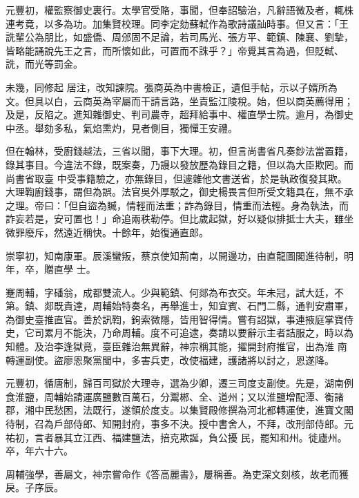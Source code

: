 \begin{pinyinscope}
 元豐初，權監察御史裏行。太學官受賂，事聞，但奉詔驗治，凡辭語微及者，輒株連考竟，以多為功。加集賢校理。同李定劾蘇軾作為歌詩議訕時事。但又言：「王詵輩公為朋比，如盛僑、周邠固不足論，若司馬光、張方平、範鎮、陳襄、劉摯，皆略能誦說先王之言，而所懷如此，可置而不誅乎？」帝覺其言為過，但貶軾、詵，而光等罰金。



 未幾，同修起
 居注，改知諫院。張商英為中書檢正，遺但手帖，示以子婿所為文。但具以白，云商英為宰屬而干請言路，坐責監江陵稅。始，但以商英薦得用；及是，反陷之。進知雜御史、判司農寺，超拜給事中、權直學士院。逾月，為御史中丞。舉劾多私，氣焰熏灼，見者側目，獨憚王安禮。



 但在翰林，受廚錢越法，三省以聞，事下大理。初，但言尚書省凡奏鈔法當置籍，錄其事目。今違法不錄，既案奏，乃謾以發放歷為錄目之籍，但以為大臣欺罔。而尚書省取臺
 中受事籍驗之，亦無錄目，但遽雜他文書送省，於是執政復發其欺。大理鞫廚錢事，謂但為誤。法官吳外厚駁之，御史楊畏言但所受文籍具在，無不承之理。帝曰：「但自盜為贓，情輕而法重；詐為錄目，情重而法輕。身為執法，而詐妄若是，安可置也！」命追兩秩勒停。但比歲起獄，好以疑似排抵士大夫，雖坐微罪廢斥，然遠近稱快。十餘年，始復通直郎。



 崇寧初，知南康軍。辰溪蠻叛，蔡京使知荊南，以開邊功，由直龍圖閣進待制，明年，卒，贈直學
 士。



 蹇周輔，字磻翁，成都雙流人。少與範鎮、何郯為布衣交。年未冠，試大廷，不第。鎮、郯既貴達，周輔始特奏名，再舉進士，知宜賓、石門二縣，通判安肅軍，為御史臺推直官。善於訊鞫，鉤索微隱，皆用智得情。嘗有詔獄，事連掖庭掌寶侍史，它司累月不能決，乃命周輔。度不可追逮，奏請以要辭示主者詰服之，時以為知體。及治李逢獄竟，臺臣雜治無異辭，神宗稱其能，擢開封府推官，出為淮
 南轉運副使。盜廖恩聚黨閩中，多害兵吏，改使福建，護諸將以討之，恩遂降。



 元豐初，循唐制，歸百司獄於大理寺，選為少卿，遷三司度支副使。先是，湖南例食淮鹽，周輔始請運廣鹽數百萬石，分鬻郴、全、道州；又以淮鹽增配潭、衡諸郡，湘中民愁困，法既行，遂領於度支。以集賢殿修撰為河北都轉運使，進寶文閣待制，召為戶部侍郎、知開封府，事多不決。授中書舍人，不拜，改刑部侍郎。元祐初，言者暴其立江西、福建鹽法，掊克欺誕，負公擾
 民，罷知和州。徙廬州。卒，年六十六。



 周輔強學，善屬文，神宗嘗命作《答高麗書》，屢稱善。為吏深文刻核，故老而獲戾。子序辰。




\end{pinyinscope}
